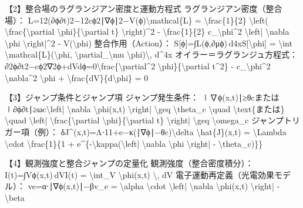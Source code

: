 \documentclass{article}
\begin{document}
【2】整合場のラグランジアン密度と運動方程式
ラグランジアン密度（整合場）：
L=12(∂ϕ∂t)2−12cϕ2∣∇ϕ∣2−V(ϕ)\textbackslash{}mathcal\{L\} = \textbackslash{}frac\{1\}\{2\} \textbackslash{}left( \textbackslash{}frac\{\textbackslash{}partial \textbackslash{}phi\}\{\textbackslash{}partial t\} \textbackslash{}right)\textasciicircum{}2 - \textbackslash{}frac\{1\}\{2\} c\_\textbackslash{}phi\textasciicircum{}2 \textbackslash{}left| \textbackslash{}nabla \textbackslash{}phi \textbackslash{}right|\textasciicircum{}2 - V(\textbackslash{}phi) 
整合作用（Action）：
S[ϕ]=∫L(ϕ,∂μϕ) d4xS[\textbackslash{}phi] = \textbackslash{}int \textbackslash{}mathcal\{L\}(\textbackslash{}phi, \textbackslash{}partial\_\textbackslash{}mu \textbackslash{}phi)\textbackslash{}, d\textasciicircum{}4x 
オイラー＝ラグランジュ方程式：
∂2ϕ∂t2−cϕ2∇2ϕ+dVdϕ=0\textbackslash{}frac\{\textbackslash{}partial\textasciicircum{}2 \textbackslash{}phi\}\{\textbackslash{}partial t\textasciicircum{}2\} - c\_\textbackslash{}phi\textasciicircum{}2 \textbackslash{}nabla\textasciicircum{}2 \textbackslash{}phi + \textbackslash{}frac\{dV\}\{d\textbackslash{}phi\} = 0 

【3】ジャンプ条件とジャンプ項
ジャンプ発生条件：
∣∇ϕ(x,t)∣≥θcまたは∣∂ϕ∂t∣≥ωc\textbackslash{}left| \textbackslash{}nabla \textbackslash{}phi(x,t) \textbackslash{}right| \textbackslash{}geq \textbackslash{}theta\_c \textbackslash{}quad \textbackslash{}text\{または\} \textbackslash{}quad \textbackslash{}left| \textbackslash{}frac\{\textbackslash{}partial \textbackslash{}phi\}\{\textbackslash{}partial t\} \textbackslash{}right| \textbackslash{}geq \textbackslash{}omega\_c 
ジャンプトリガー項（例）：
δJ\textasciicircum{}(x,t)=Λ⋅11+e−κ(∣∇ϕ∣−θc)\textbackslash{}delta \textbackslash{}hat\{J\}(x,t) = \textbackslash{}Lambda \textbackslash{}cdot \textbackslash{}frac\{1\}\{1 + e\textasciicircum{}\{-\textbackslash{}kappa(\textbackslash{}left| \textbackslash{}nabla \textbackslash{}phi \textbackslash{}right| - \textbackslash{}theta\_c)\}\} 

【4】観測強度と整合ジャンプの定量化
観測強度（整合密度積分）：
I(t)=∫Vϕ(x,t) dVI(t) = \textbackslash{}int\_V \textbackslash{}phi(x,t) \textbackslash{}, dV 
電子運動再定義（光電効果モデル）：
ve=α⋅∣∇ϕ(x,t)∣−βv\_e = \textbackslash{}alpha \textbackslash{}cdot \textbackslash{}left| \textbackslash{}nabla \textbackslash{}phi(x,t) \textbackslash{}right| - \textbackslash{}beta 
\end{document}
